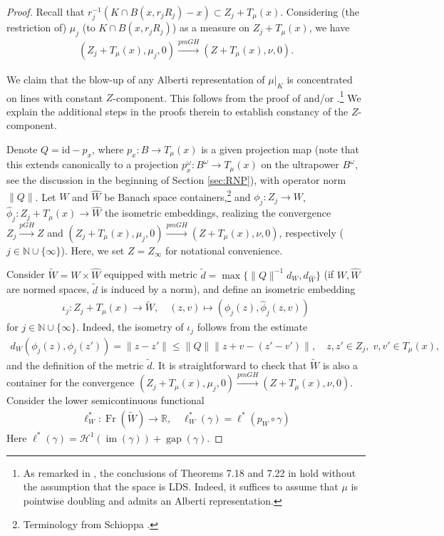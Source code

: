 \documentclass{amsart}
\numberwithin{equation}{section}
\newcommand{\R}{\mathbb{R}}
\newcommand{\N}{\mathbb{N}}
\newcommand{\Ha}{\mathcal{H}}
\newcommand{\im}{\operatorname{im}}
\newcommand{\gap}{\operatorname{gap}}
\newcommand{\Fr}{\operatorname{Fr}}
\newcommand{\id}{\mathrm {id}}
\newcommand{\inv}{^{-1}}
\begin{document}
\begin{proof}
Recall that $r_j\inv(K\cap B(x,r_jR_j)-x)\subset Z_j+T_\mu(x)$. Considering  (the restriction of) $\mu_j$ (to $K\cap B(x,r_jR_j)$) as a measure on $Z_j+T_\mu(x)$, we have
\begin{align*}
(Z_j+T_\mu(x),\mu_j,0)\stackrel{pmGH}{\longrightarrow} (Z+T_\mu(x),\nu,0).
\end{align*}

We claim that the blow-up of any Alberti representation of $\mu|_K$ is concentrated on lines with constant $Z$-component. This follows from the proof of \cite[Theorem 3.11]{sch16a} and/or \cite[Theorems 7.18 and 7.22]{CKS}.\footnote{As remarked in \cite{sch16a}, the conclusions of Theorems 7.18 and 7.22 in \cite{CKS} hold without the assumption that the space is LDS. Indeed, it suffices to assume that $\mu$ is pointwise doubling and admits an Alberti representation.} We explain the additional steps in the proofs therein to establish constancy of the $Z$-component. 

Denote $Q=\id-p_x$, where $p_x:B\to T_\mu(x)$ is a given projection map (note that this extends canonically to a projection $p_x^\omega:B^\omega\to T_\mu(x)$ on the ultrapower $B^\omega$, see the discussion in the beginning of Section \ref{sec:RNP}), with operator norm $\|Q\|$. Let $W$ and $\widehat W$ be Banach space containers,\footnote{Terminology from Schioppa \cite[Definition 3.1]{sch16a}.} and $\phi_j:Z_j\to W$, $\widehat\phi_j:Z_j+T_\mu(x)\to \widehat W$ the isometric embeddings, realizing the convergence $Z_j\stackrel{pGH}{\longrightarrow}Z$ and $(Z_j+T_\mu(x),\mu_j,0)\stackrel{pmGH}{\longrightarrow}(Z+T_\mu(x),\nu,0)$, respectively ($j\in\N\cup\{\infty\}$). Here, we set $Z=Z_\infty$ for notational convenience.




Consider $\widetilde W=W\times \widehat W$ equipped with metric $\tilde d=\max\{\|Q\|\inv d_W,d_{\widehat W}\}$ (if $W,\widehat W$ are normed spaces, $\tilde d$ is induced by a norm), and define an isometric embedding
\begin{align*}
\iota_j:Z_j+T_\mu(x)\to \widetilde W,\quad (z,v)\mapsto (\phi_j(z),\widehat\phi_j(z,v))
\end{align*}
for $j\in\N\cup\{\infty\}$. Indeed, the isometry of $\iota_j$ follows from the estimate
\begin{align*}
d_W(\phi_j(z),\phi_j(z'))=\|z-z'\|\le \|Q\|\|z+v-(z'-v')\|,\quad z,z'\in Z_j,\; v,v'\in T_\mu(x),
\end{align*}
and the definition of the metric $\tilde d$. It is straightforward to check that $\widetilde W$ is also a container for the convergence $(Z_j+T_\mu(x),\mu_j,0)\stackrel{pmGH}{\longrightarrow}(Z+T_\mu(x),\nu,0)$. Consider the lower semicontinuous functional 
\begin{align*}
    \ell_W^*:\Fr(\widetilde W)\to \R,\quad \ell_W^*(\gamma)=\ell^*(p_W\circ\gamma)
\end{align*}
Here $\ell^*(\gamma)=\Ha^1(\im(\gamma))+\gap(\gamma)$. 


\end{proof}
\end{document}
